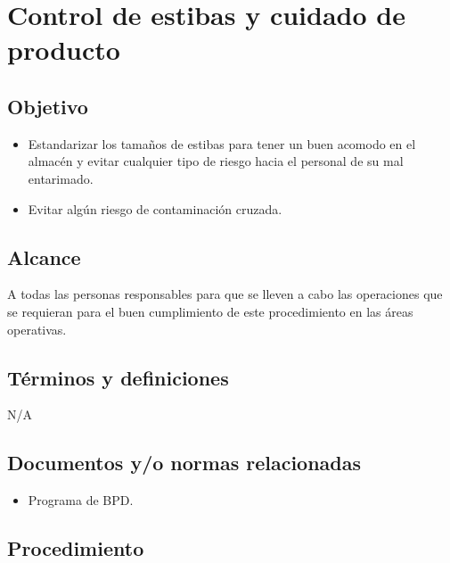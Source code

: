 \thispagestyle{formato-PI}
\renewcommand{\MayorVer}{2}
\renewcommand{\MenorVer}{0}
\renewcommand{\FechaPub}{2023--01}
\renewcommand{\TipoID}{ESP}
\renewcommand{\Titulo}{Control de estibas y cuidado de producto}

\section{\Titulo}\label{ESP-ControlDeEstibas}
\renewcommand{\Codigo}{\Prog--\thesection--\TipoID} %

\subsection{Objetivo}

\begin{itemize}
	\item Estandarizar los tamaños de estibas para tener un buen acomodo en el almacén y evitar cualquier tipo de riesgo hacia el personal de su mal entarimado.
	\item Evitar algún riesgo de contaminación cruzada.
\end{itemize}

\subsection{Alcance}

A todas las personas responsables para que se lleven a cabo las operaciones que se requieran para el buen cumplimiento de este procedimiento en las áreas operativas.

\subsection{Términos y definiciones}

N/A

\subsection{Documentos y/o normas relacionadas}

\begin{itemize}
	\item Programa de \gls{BPD}.
\end{itemize}

\subsection{Procedimiento}


